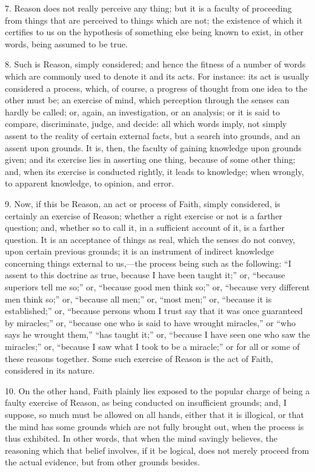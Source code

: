 7. Reason does not really perceive any thing; but it is a faculty
of proceeding from things that are perceived to things which are not;
the existence of which it certifies to us on the hypothesis of
something else being known to exist, in other words, being assumed to
be true.

8. Such is Reason, simply considered; and hence the fitness of a
number of words which are commonly used to denote it and its acts. For
instance: its act is usually considered a process, which, of course, a
progress of thought from one idea to the other must be; an exercise of
mind, which perception through the senses can hardly be called; or,
again, an investigation, or an analysis; or it is said to compare,
discriminate, judge, and decide: all which words imply, not simply
assent to the reality of certain external facts, but a search into
grounds, and an assent upon grounds. It is, then, the faculty of
gaining knowledge upon grounds given; and its exercise lies in
asserting one thing, because of some other thing; and, when its
exercise is conducted rightly, it leads to knowledge; when wrongly, to
apparent knowledge, to opinion, and error.

9. Now, if this be Reason, an act or process of Faith, simply
considered, is certainly an exercise of Reason; whether a right
exercise or not is a farther question; and, whether so to call it, in
a sufficient account of it, is a farther question. It is an acceptance
of things as real, which the senses do not convey, upon certain
previous grounds; it is an instrument of indirect knowledge concerning
things external to us,—the process being such as the following:
``I assent to this doctrine as true, because I have been taught
it;'' or, ``because superiors tell me so;'' or,
``because good men think so;'' or, ``because very
different men think so;'' or, ``because all men;'' or,
``most men;'' or, ``because it is established;'' or,
``because persons whom I trust say that it was once guaranteed by
miracles;'' or, ``because one who is said to have wrought
miracles,'' or ``who says he wrought them,'' ``has
taught it;'' or, ``because I have seen one who saw the
miracles;'' or, ``because I saw what I took to be a
miracle;'' or for all or some of these reasons together. Some such
exercise of Reason is the act of Faith, considered in its nature.

10. On the other hand, Faith plainly lies exposed to the popular
charge of being a faulty exercise of Reason, as being conducted on
insufficient grounds; and, I suppose, so much must be allowed on all
hands, either that it is illogical, or that the mind has some grounds
which are not fully brought out, when the process is thus exhibited.
In other words, that when the mind savingly believes, the reasoning
which that belief involves, if it be logical, does not merely proceed
from the actual evidence, but from other grounds besides.

